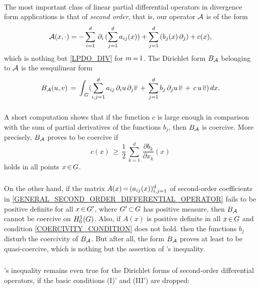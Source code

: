 \documentclass[11pt,twoside]{article}
\def\G{G}
\begin{document}
\paragraph{} %
The most important class of linear partial differential operators
in divergence form {\wrt} applications is that of \textit{second order},
that is,
our operator ${\mathcal{A}}$ is of the form
\begin{equation}\label{GENERAL_SECOND_ORDER_DIFFERENTIAL_OPERATOR}
{\mathcal{A}}(x,\cdot) = 
-\sum_{i=1}^d \,
\partial_i \, (\sum_{j=1}^d a_{ij}(x)) 
+
\sum_{j=1}^d \, (b_j(x) \, \partial_j)
+
c(x),
\end{equation}
which is nothing but \eqref{LPDO_DIV} for $m {\,=\,} 1$.
The Dirichlet form $B_{{\mathcal{A}}}$ belonging to ${\mathcal{A}}$ is the sesquilinear form
\[
\DF_{\A}(u,v) \= \int_{\,\G} 
(\sum_{i,j=1}^d a_{ij} \, \partial_i u \, \partial_j \overline{v} \+ 
 \sum_{j=1}^d b_j \, \partial_j u \, \overline{v} \+
 c \,u \, \overline{v}
)
\, dx.
\]

\subparagraph{} %
A short computation shows
that if the function $c$ is large enough in comparison
with the sum of partial derivatives of the functions $b_j$,
then $B_{{\mathcal{A}}}$ is coercive.
More precisely,
$B_{{\mathcal{A}}}$ proves to be coercive if
\begin{equation}\label{COERCIVITY_CONDITION}
c(x) \, \geq \, \frac{1}{2} \,
\sum_{k=1}^d \, \frac{\partial b_k}{\partial x_k}(x)
\end{equation}
holds in all points $x \xeof \G$.

\subparagraph{}
On the other hand,
if the matrix $A(x) {\,=\,} (a_{ij}(x))_{i,j=1}^d$ of second-order coefficients
in \eqref{GENERAL_SECOND_ORDER_DIFFERENTIAL_OPERATOR}
fails to be positive definite for all $x \xeof \G'$,
where $\G' \xsubset \G$ has positive measure,
then $B_{{\mathcal{A}}}$ cannot be coercive on $\HN{1}{\G}$.
Also,
if $A(x)$ is positive definite in all $x \xeof \G$
and condition \eqref{COERCIVITY_CONDITION} does not hold.
then the functions $b_j$ disturb the coercivity of $B_{{\mathcal{A}}}$.
But after all,
the form $B_{{\mathcal{A}}}$ proves at least to be quasi-coercive,
which is nothing but the assertion of \textsc{\GARDING}'s inequality.

\subparagraph{} %
\textsc{\GARDING}'s inequality remains even true
for the Dirichlet forms of second-order differential operators,
if the basic conditions (I)' and (III') are dropped:
\end{document}
